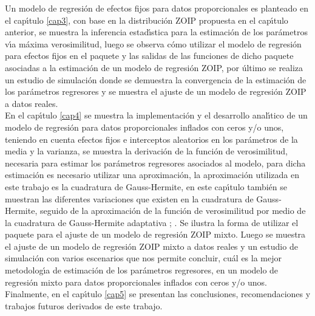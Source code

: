 Un modelo de regresi\'{o}n de efectos fijos para datos proporcionales es planteado en el cap\'{\i}tulo \ref{cap3}, con base en la distribuci\'{o}n ZOIP propuesta en el cap\'{\i}tulo anterior, se muestra la inferencia estad\'{\i}stica para la estimaci\'{o}n de los par\'{a}metros v\'{\i}a m\'{a}xima verosimilitud, luego se observa c\'{o}mo utilizar el modelo de regresi\'{o}n para efectos fijos en el paquete  y las salidas de las funciones de dicho paquete asociadas a la estimaci\'{o}n de un modelo de regresi\'{o}n ZOIP, por \'{u}ltimo se realiza un estudio de simulaci\'{o}n donde se demuestra la convergencia de la estimaci\'{o}n de los par\'{a}metros regresores y se muestra el ajuste de un modelo de regresi\'{o}n ZOIP a datos reales.\\

En el cap\'{\i}tulo \ref{cap4} se muestra la implementaci\'{o}n y el desarrollo anal\'{\i}tico de un modelo de regresi\'{o}n para datos proporcionales inflados con ceros y/o unos, teniendo en cuenta efectos fijos e interceptos aleatorios en los par\'{a}metros de la media y la varianza, se muestra la derivaci\'{o}n de la funci\'{o}n de verosimilitud, necesaria para estimar los par\'{a}metros regresores asociados al modelo, para dicha estimaci\'{o}n es necesario utilizar una aproximaci\'{o}n, la aproximaci\'{o}n utilizada en este trabajo es la cuadratura de Gauss-Hermite, en este cap\'{\i}tulo tambi\'{e}n se muestran las diferentes variaciones que existen en la cuadratura de Gauss-Hermite, seguido de la aproximaci\'{o}n de la funci\'{o}n de verosimilitud por medio de la cuadratura de Gauss-Hermite adaptativa \citep{Liu1}; \citep{Pinheiro1}. Se ilustra la forma de utilizar el paquete  para el ajuste de un modelo de regresi\'{o}n ZOIP mixto. Luego se muestra el ajuste de un modelo de regresi\'{o}n ZOIP mixto a datos reales y un estudio de simulaci\'{o}n con varios escenarios que nos permite concluir, cu\'{a}l es la mejor metodolog\'{\i}a de estimaci\'{o}n de los par\'{a}metros regresores, en un modelo de regresi\'{o}n mixto para datos proporcionales inflados con ceros y/o unos.\\

Finalmente, en el cap\'{\i}tulo \ref{cap5} se presentan las conclusiones, recomendaciones y trabajos futuros derivados de este trabajo.


 










